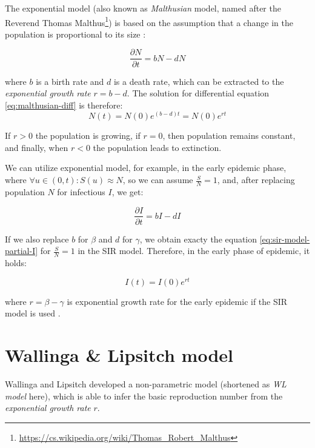 \documentclass[
  digital, %
  oneside, %
  lof,     %
  lot,     %
]{fithesis4}
\begin{document}
The exponential model (also known as \textit{Malthusian} model, named after the 
Reverend Thomas Malthus\footnote{\url{https://cs.wikipedia.org/wiki/Thomas_Robert_Malthus}})
is based on the assumption that a change in the population 
is proportional to its size \cite{martcheva2015}:

\begin{equation}\label{eq:malthusian-diff}
  \frac{\partial N}{\partial t} = b N - d N
\end{equation}

where $b$ is a birth rate and $d$ is a death rate, which 
can be extracted to the \textit{exponential growth rate} $r = b - d$.
The solution for differential equation \eqref{eq:malthusian-diff} is therefore:
\begin{equation}
  N(t) = N(0) e^{(b - d)t} = N(0) e^{rt}
\end{equation}

If $r > 0$ the population is growing,
if $r = 0$, then population remains constant, and finally, 
when $r < 0$ the population leads to extinction.

We can utilize exponential model,
for example, in the early epidemic phase,
where $\forall u \in (0, t) : S(u) \approx N$, so we can assume $\frac{S}{N} = 1$,
and, after replacing population $N$ for infectious $I$, we get:

\begin{equation}
  \frac{\partial I}{\partial t} = b I - d I
\end{equation}

If we also replace $b$ for $\beta$ and $d$ for $\gamma$, we
obtain exacty the equation \eqref{eq:sir-model-partial-I} for $\frac{S}{N} = 1$ in the SIR model.
Therefore, in the early phase of epidemic, it holds:

\begin{equation}
  I(t) = I(0) e^{rt}
\end{equation}

where $r = \beta - \gamma$ is exponential growth rate for the early epidemic
if the SIR model is used \cite{ma2019}.



\section{Wallinga \& Lipsitch model}
\label{sec:wl-model}

Wallinga and Lipsitch \cite{wallinga2007} developed a non-parametric
model (shortened as \textit{WL model} here), which is able to infer
the basic reproduction number from the \textit{exponential growth rate} $r$.
\end{document}

